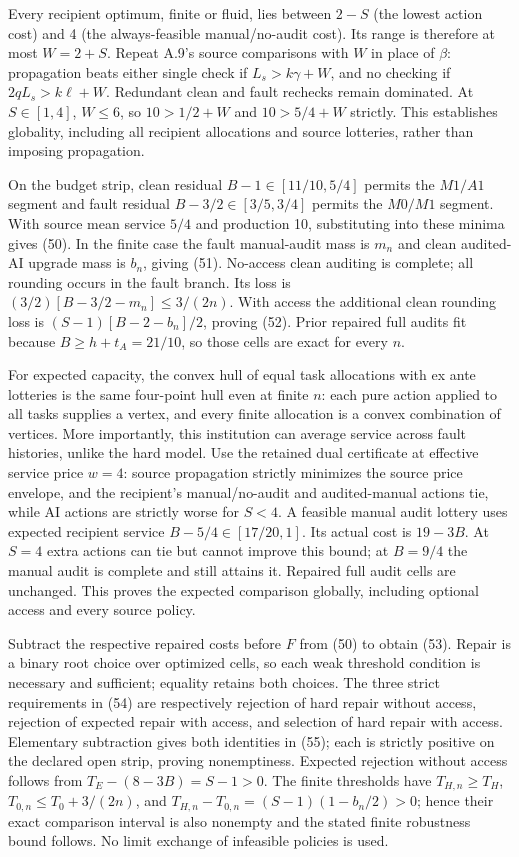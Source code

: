 \documentclass[
  11pt,
  a4paper,
]{article}
\begin{document}
Every recipient optimum, finite or fluid, lies between \(2-S\) (the
lowest action cost) and 4 (the always-feasible manual/no-audit cost).
Its range is therefore at most \(W=2+S\). Repeat A.9's source
comparisons with \(W\) in place of \(\beta\): propagation beats either
single check if \(L_s>k\gamma+W\), and no checking if \(2qL_s>k\ell+W\).
Redundant clean and fault rechecks remain dominated. At \(S\in[1,4]\),
\(W\leq6\), so \(10>1/2+W\) and \(10>5/4+W\) strictly. This establishes
globality, including all recipient allocations and source lotteries,
rather than imposing propagation.

On the budget strip, clean residual \(B-1\in[11/10,5/4]\) permits the
\(M1/A1\) segment and fault residual \(B-3/2\in[3/5,3/4]\) permits the
\(M0/M1\) segment. With source mean service \(5/4\) and production 10,
substituting into these minima gives (50). In the finite case the fault
manual-audit mass is \(m_n\) and clean audited-AI upgrade mass is
\(b_n\), giving (51). No-access clean auditing is complete; all rounding
occurs in the fault branch. Its loss is \((3/2)[B-3/2-m_n]\leq3/(2n)\).
With access the additional clean rounding loss is \((S-1)[B-2-b_n]/2\),
proving (52). Prior repaired full audits fit because
\(B\geq h+t_A=21/10\), so those cells are exact for every \(n\).

For expected capacity, the convex hull of equal task allocations with ex
ante lotteries is the same four-point hull even at finite \(n\): each
pure action applied to all tasks supplies a vertex, and every finite
allocation is a convex combination of vertices. More importantly, this
institution can average service across fault histories, unlike the hard
model. Use the retained dual certificate at effective service price
\(w=4\): source propagation strictly minimizes the source price
envelope, and the recipient's manual/no-audit and audited-manual actions
tie, while AI actions are strictly worse for \(S<4\). A feasible manual
audit lottery uses expected recipient service \(B-5/4\in[17/20,1]\). Its
actual cost is \(19-3B\). At \(S=4\) extra actions can tie but cannot
improve this bound; at \(B=9/4\) the manual audit is complete and still
attains it. Repaired full audit cells are unchanged. This proves the
expected comparison globally, including optional access and every source
policy.

Subtract the respective repaired costs before \(F\) from (50) to obtain
(53). Repair is a binary root choice over optimized cells, so each weak
threshold condition is necessary and sufficient; equality retains both
choices. The three strict requirements in (54) are respectively
rejection of hard repair without access, rejection of expected repair
with access, and selection of hard repair with access. Elementary
subtraction gives both identities in (55); each is strictly positive on
the declared open strip, proving nonemptiness. Expected rejection
without access follows from \(T_E-(8-3B)=S-1>0\). The finite thresholds
have \(T_{H,n}\geq T_H\), \(T_{0,n}\leq T_0+3/(2n)\), and
\(T_{H,n}-T_{0,n}=(S-1)(1-b_n/2)>0\); hence their exact comparison
interval is also nonempty and the stated finite robustness bound
follows. No limit exchange of infeasible policies is used.
\end{document}
